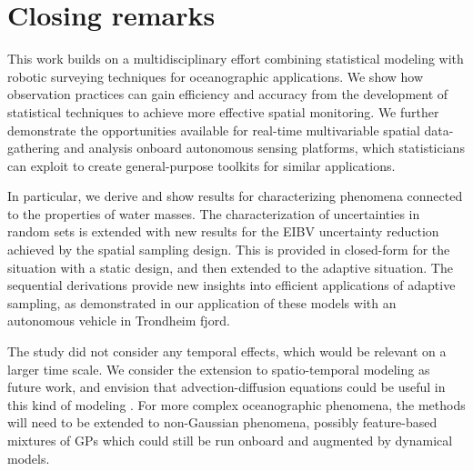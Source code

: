 \documentclass[aoas]{imsart}
\begin{document}
\section{Closing remarks}\label{sec:concl_disc}

This work builds on a multidisciplinary effort combining statistical
modeling with robotic surveying techniques for oceanographic
applications. We show how observation practices can gain efficiency
and accuracy from the development of statistical techniques to achieve
more effective spatial monitoring. We further demonstrate the
opportunities available for real-time multivariable spatial
data-gathering and analysis onboard autonomous sensing platforms,
which statisticians can exploit to create general-purpose toolkits for
similar applications.

In particular, we derive and show results for characterizing phenomena
connected to the properties of water masses. The characterization of uncertainties in random sets is extended with new results for the EIBV uncertainty
reduction achieved by the spatial sampling design. This is provided in closed-form for the situation with a static
design, and then extended to the adaptive situation. The sequential
derivations provide new insights into efficient applications of
adaptive sampling, as demonstrated in our application of these models
with an autonomous vehicle in Trondheim fjord.

The study did not consider any temporal effects, which would be
relevant on a larger time scale. We consider the extension to
spatio-temporal modeling as future work, and envision that
advection-diffusion equations could be useful in this kind of modeling
\citep{sigrist2015stochastic}. For more complex oceanographic
phenomena, the methods will need to be extended to non-Gaussian
phenomena, possibly feature-based mixtures of GPs which could still be
run onboard and augmented by dynamical models.
\end{document}
